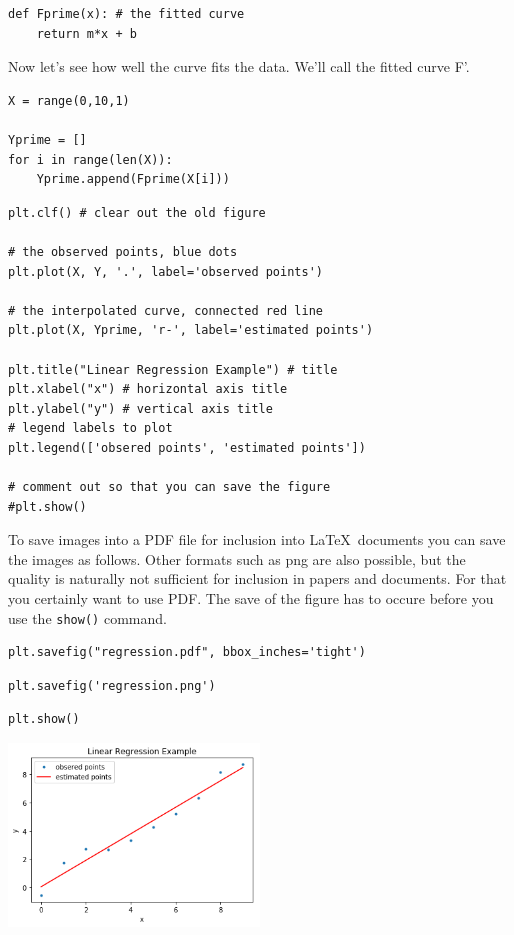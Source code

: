 \begin{verbatim}
def Fprime(x): # the fitted curve
    return m*x + b
\end{verbatim}

Now let's see how well the curve fits the data. We'll call the fitted
curve F'.

\begin{verbatim}
X = range(0,10,1)

Yprime = []
for i in range(len(X)):
    Yprime.append(Fprime(X[i]))
\end{verbatim}

\begin{verbatim}
plt.clf() # clear out the old figure

# the observed points, blue dots
plt.plot(X, Y, '.', label='observed points') 

# the interpolated curve, connected red line
plt.plot(X, Yprime, 'r-', label='estimated points')  

plt.title("Linear Regression Example") # title
plt.xlabel("x") # horizontal axis title
plt.ylabel("y") # vertical axis title
# legend labels to plot
plt.legend(['obsered points', 'estimated points']) 

# comment out so that you can save the figure
#plt.show()
\end{verbatim}

To save images into a PDF file for inclusion into \LaTeX~documents you
can save the images as follows. Other formats such as png are also
possible, but the quality is naturally not sufficient for inclusion in
papers and documents. For that you certainly want to use PDF. The save
of the figure has to occure before you use the \verb|show()| command.

\begin{verbatim}
plt.savefig("regression.pdf", bbox_inches='tight')
\end{verbatim}

\begin{verbatim}
plt.savefig('regression.png') 
\end{verbatim}

\begin{verbatim}
plt.show()
\end{verbatim}

\begin{center}
\includegraphics[width=0.5\textwidth]{scipy/output_40_0.png}
\end{center}


